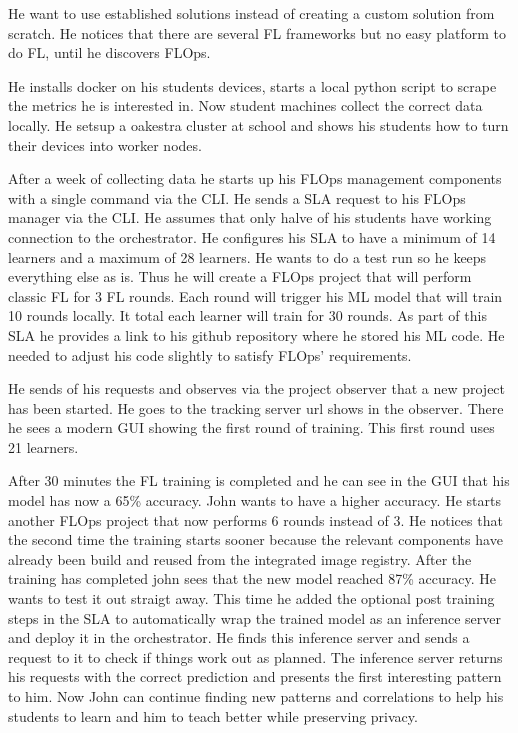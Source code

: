 He want to use established solutions instead of creating a custom solution from scratch.
He notices that there are several FL frameworks but no easy platform to do FL, until he discovers FLOps.

He installs docker on his students devices, starts a local python script to scrape the metrics he is interested in.
Now student machines collect the correct data locally.
He setsup a oakestra cluster at school and shows his students how to turn their devices into worker nodes.

After a week of collecting data he starts up his FLOps management components with a single command via the CLI.
He sends a SLA request to his FLOps manager via the CLI.
He assumes that only halve of his students have working connection to the orchestrator.
He configures his SLA to have a minimum of 14 learners and a maximum of 28 learners.
He wants to do a test run so he keeps everything else as is.
Thus he will create a FLOps project that will perform classic FL for 3 FL rounds.
Each round will trigger his ML model that will train 10 rounds locally.
It total each learner will train for 30 rounds.
As part of this SLA he provides a link to his github repository where he stored his ML code.
He needed to adjust his code slightly to satisfy FLOps' requirements.

He sends of his requests and observes via the project observer that a new project has been started.
He goes to the tracking server url shows in the observer.
There he sees a modern GUI showing the first round of training.
This first round uses 21 learners.

After 30 minutes the FL training is completed and he can see in the GUI that his model has now a 65\% accuracy.
John wants to have a higher accuracy.
He starts another FLOps project that now performs 6 rounds instead of 3.
He notices that the second time the training starts sooner because the relevant components have already been build and reused from the integrated image registry.
After the training has completed john sees that the new model reached 87\% accuracy.
He wants to test it out straigt away.
This time he added the optional post training steps in the SLA to automatically wrap the trained model as an inference server and deploy it in the orchestrator.
He finds this inference server and sends a request to it to check if things work out as planned.
The inference server returns his requests with the correct prediction and presents the first interesting pattern to him.
Now John can continue finding new patterns and correlations to help his students to learn and him to teach better while preserving privacy.




